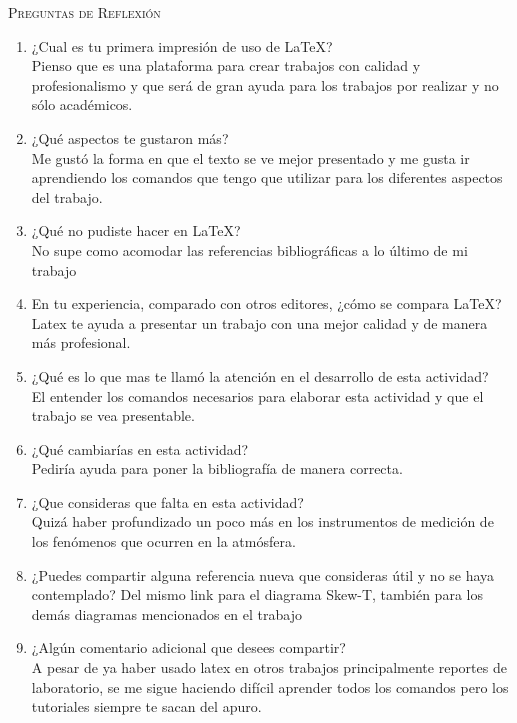 \documentclass[12pt]{article}
\begin{document}
\textsc{Preguntas de Reflexión} \\

\begin{enumerate}
\item ¿Cual es tu primera impresión de uso de LaTeX?\\
Pienso que es una plataforma para crear trabajos con calidad y profesionalismo y que será de gran ayuda para los trabajos por realizar y no sólo académicos. 

\item ¿Qué aspectos te gustaron más? \\
Me gustó la forma en que el texto se ve mejor presentado y me gusta ir aprendiendo los comandos que tengo que utilizar para los diferentes aspectos del trabajo.

\item ¿Qué no pudiste hacer en LaTeX?\\
No supe como acomodar las referencias bibliográficas a lo último de mi trabajo


\item En tu experiencia, comparado con otros editores, ¿cómo se compara LaTeX? \\
Latex te ayuda a presentar un trabajo con una mejor calidad y de manera más profesional.

\item ¿Qué es lo que mas te llamó la atención en el desarrollo de esta actividad? \\
El entender los comandos necesarios para elaborar esta actividad y que el trabajo se vea presentable.

\item ¿Qué cambiarías en esta actividad? \\
Pediría ayuda para poner la bibliografía de manera correcta.

\item ¿Que consideras que falta en esta actividad? \\
Quizá haber profundizado un poco más en los instrumentos de medición de los fenómenos que ocurren en la atmósfera.

\item ¿Puedes compartir alguna referencia nueva que consideras útil y no se haya contemplado?
Del mismo link para el diagrama Skew-T, también para los demás diagramas mencionados en el trabajo

\item ¿Algún comentario adicional que desees compartir? \\
A pesar de ya haber usado latex en otros trabajos principalmente reportes de laboratorio, se me sigue haciendo difícil aprender todos los comandos pero los tutoriales siempre te sacan del apuro.

\end{enumerate}
\end{document}
